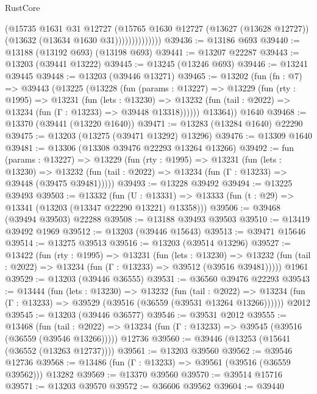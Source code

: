 \begin{lexlean}{RustCore}
\begin{coremodule}
                        (@15735
                          @1631
                          @31
                          @12727
                          (@15765
                            @1630
                            @12727
                            (@13627 (@13628 @12727))
                            (@13632 (@13634 @1630 @31))))))))))))))
@39436 := @13186 @693
@39440 := @13188 (@13192 @693) (@13198 @693)
@39441 := @13207 @22287
@39443 := @13203 (@39441 @13222)
@39445 := @13245 (@13246 @693)
@39446 := @13241 @39445
@39448 := @13203 (@39446 @13271)
@39465 := @13202
    (fun (fn : @7) =>
    @39443
      (@13225
        (@13228
          (fun (params : @13227) =>
          @13229
            (fun (rty : @1995) =>
            @13231
              (fun (lets : @13230) =>
              @13232 (fun (tail : @2022) => @13234 (fun (Γ : @13233) => @39448 @13318))))))
        @13364))
    @1640
@39468 := @13370 (@39441 (@13220 @1640))
@39471 := @13283 (@13284 @1640) @22290
@39475 := @13203 (@13275 (@39471 @13292) @13296)
@39476 := @13309 @1640
@39481 := @13306 (@13308 @39476 @22293 @13264 @13266)
@39492 := fun (params : @13227) =>
  @13229
    (fun (rty : @1995) =>
    @13231
      (fun (lets : @13230) =>
      @13232 (fun (tail : @2022) => @13234 (fun (Γ : @13233) => @39448 (@39475 @39481)))))
@39493 := @13228 @39492
@39494 := @13225 @39493
@39503 := @13332
    (fun (U : @13331) => @13333 (fun (t : @29) => @13341 (@13203 (@13347 @22290 @13221) @13358)))
@39506 := @39468 (@39494 @39503) @22288
@39508 := @13188 @39493 @39503
@39510 := @13419 @39492 @1969
@39512 := @13203 (@39446 @15643)
@39513 := @39471 @15646
@39514 := @13275 @39513
@39516 := @13203 (@39514 @13296)
@39527 := @13422
    (fun (rty : @1995) =>
    @13231
      (fun (lets : @13230) =>
      @13232 (fun (tail : @2022) => @13234 (fun (Γ : @13233) => @39512 (@39516 @39481)))))
    @1961
@39529 := @13203 (@39446 @36555)
@39531 := @36560 @39476 @22293
@39543 := @13444
    (fun (lets : @13230) =>
    @13232
      (fun (tail : @2022) =>
      @13234 (fun (Γ : @13233) => @39529 (@39516 (@36559 (@39531 @13264 @13266))))))
    @2012
@39545 := @13203 (@39446 @36577)
@39546 := @39531 @2012
@39555 := @13468
    (fun (tail : @2022) => @13234 (fun (Γ : @13233) => @39545 (@39516 (@36559 (@39546 @13266)))))
    @12736
@39560 := @39446 (@13253 (@15641 (@36552 (@13263 @12737))))
@39561 := @13203 @39560
@39562 := @39546 @12736
@39568 := @13486 (fun (Γ : @13233) => @39561 (@39516 (@36559 @39562))) @13282
@39569 := @13370 @39560
@39570 := @39514 @15716
@39571 := @13203 @39570
@39572 := @36606 @39562
@39604 := @39440

\end{coremodule}
\end{lexlean}
